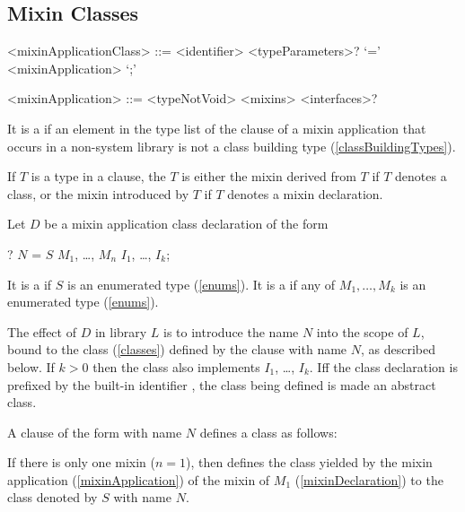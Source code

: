 \documentclass[makeidx]{article}
\begin{document}
\subsection{Mixin Classes}

\begin{grammar}
<mixinApplicationClass> ::= \gnewline{}
  <identifier> <typeParameters>? `=' <mixinApplication> `;'

<mixinApplication> ::= <typeNotVoid> <mixins> <interfaces>?
\end{grammar}

\LMHash{}%
It is a  if an element in
the type list of the \WITH{} clause of a mixin application
that occurs in a non-system library
is not a class building type
(\ref{classBuildingTypes}).

\LMHash{}%
If $T$ is a type in a \WITH{} clause, the
$T$ is either the mixin derived from $T$ if $T$ denotes a class,
or the mixin introduced by $T$ if $T$ denotes a mixin declaration.

\LMHash{}%
Let $D$ be a mixin application class declaration of the form

\begin{normativeDartCode}
\ABSTRACT? \CLASS{} $N$ = $S$ \WITH{} $M_1$, \ldots, $M_n$ \IMPLEMENTS{} $I_1$, \ldots, $I_k$;
\end{normativeDartCode}

\LMHash{}%
It is a  if $S$ is an enumerated type (\ref{enums}).
It is a
 if any of $M_1, \ldots, M_k$ is an enumerated type
(\ref{enums}).

\LMHash{}%
The effect of $D$ in library $L$ is to introduce the name $N$ into
the scope of $L$, bound to the class (\ref{classes}) defined by the clause
with name $N$, as described below.
If $k > 0$ then the class also implements $I_1$, \ldots, $I_k$.
If{}f the class declaration is prefixed by the built-in identifier \ABSTRACT,
the class being defined is made an abstract class.

\LMHash{}%
A clause of the form 
with name $N$ defines a class as follows:

\LMHash{}%
If there is only one mixin ($n = 1$), then 
defines the class yielded by the mixin application (\ref{mixinApplication})
of the mixin of $M_1$ (\ref{mixinDeclaration}) to the class denoted by
$S$ with name $N$.
\end{document}
